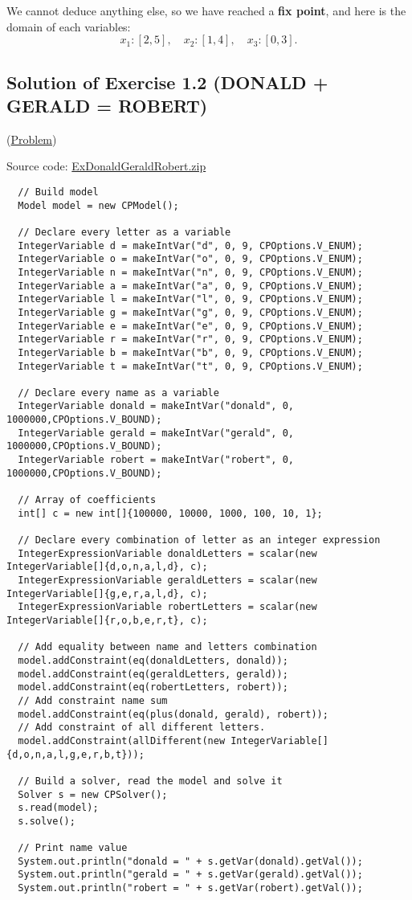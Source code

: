 We cannot deduce anything else, so we have reached a \textbf{fix point}, and here is the domain of each variables:
$$x_{1} : [2,5],\quad x_{2} : [1,4],\quad x_{3} : [0,3].$$


\subsection{Solution of Exercise 1.2 (DONALD + GERALD = ROBERT)}\label{solutions:solutionofexercise1.2}\hypertarget{solutions:solutionofexercise1.2}{}

(\hyperlink{exercises:exercise1.2}{Problem})

Source code: \href{media/zip/exdonaldgeraldrobert.zip}{ExDonaldGeraldRobert.zip}

\begin{lstlisting}
  // Build model
  Model model = new CPModel();
  
  // Declare every letter as a variable
  IntegerVariable d = makeIntVar("d", 0, 9, CPOptions.V_ENUM);
  IntegerVariable o = makeIntVar("o", 0, 9, CPOptions.V_ENUM);
  IntegerVariable n = makeIntVar("n", 0, 9, CPOptions.V_ENUM);
  IntegerVariable a = makeIntVar("a", 0, 9, CPOptions.V_ENUM);
  IntegerVariable l = makeIntVar("l", 0, 9, CPOptions.V_ENUM);
  IntegerVariable g = makeIntVar("g", 0, 9, CPOptions.V_ENUM);
  IntegerVariable e = makeIntVar("e", 0, 9, CPOptions.V_ENUM);
  IntegerVariable r = makeIntVar("r", 0, 9, CPOptions.V_ENUM);
  IntegerVariable b = makeIntVar("b", 0, 9, CPOptions.V_ENUM);
  IntegerVariable t = makeIntVar("t", 0, 9, CPOptions.V_ENUM);
  
  // Declare every name as a variable  
  IntegerVariable donald = makeIntVar("donald", 0, 1000000,CPOptions.V_BOUND);
  IntegerVariable gerald = makeIntVar("gerald", 0, 1000000,CPOptions.V_BOUND);
  IntegerVariable robert = makeIntVar("robert", 0, 1000000,CPOptions.V_BOUND);
  
  // Array of coefficients
  int[] c = new int[]{100000, 10000, 1000, 100, 10, 1}; 
  
  // Declare every combination of letter as an integer expression
  IntegerExpressionVariable donaldLetters = scalar(new IntegerVariable[]{d,o,n,a,l,d}, c);
  IntegerExpressionVariable geraldLetters = scalar(new IntegerVariable[]{g,e,r,a,l,d}, c);
  IntegerExpressionVariable robertLetters = scalar(new IntegerVariable[]{r,o,b,e,r,t}, c);
  
  // Add equality between name and letters combination
  model.addConstraint(eq(donaldLetters, donald));
  model.addConstraint(eq(geraldLetters, gerald));
  model.addConstraint(eq(robertLetters, robert));
  // Add constraint name sum
  model.addConstraint(eq(plus(donald, gerald), robert));
  // Add constraint of all different letters.
  model.addConstraint(allDifferent(new IntegerVariable[]{d,o,n,a,l,g,e,r,b,t}));
  
  // Build a solver, read the model and solve it
  Solver s = new CPSolver();
  s.read(model);
  s.solve();
  
  // Print name value
  System.out.println("donald = " + s.getVar(donald).getVal());
  System.out.println("gerald = " + s.getVar(gerald).getVal());
  System.out.println("robert = " + s.getVar(robert).getVal());
\end{lstlisting}

